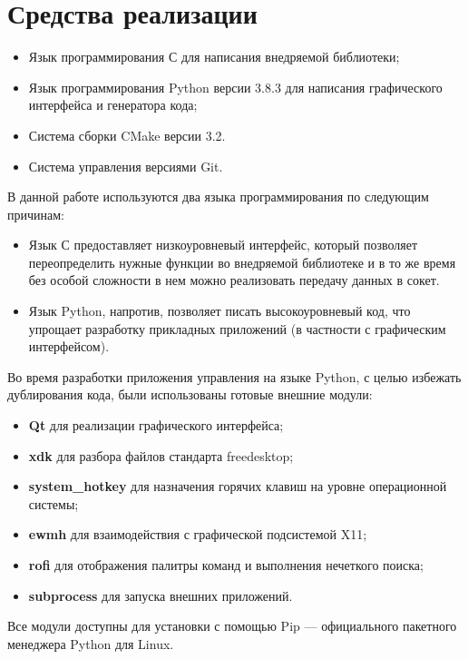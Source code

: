 \section{Средства реализации}

\begin{itemize}
	\item Язык программирования С для написания внедряемой библиотеки;
	\item Язык программирования Python версии 3.8.3 для написания графического
		интерфейса и генератора кода;
	\item Система сборки CMake версии 3.2.
	\item Система управления версиями Git.
\end{itemize}

В данной работе используются два языка программирования по следующим причинам:

\begin{itemize}
	\item Язык С предоставляет низкоуровневый интерфейс, который позволяет
		переопределить нужные функции во внедряемой библиотеке и в то же время
		без особой сложности в нем можно реализовать передачу данных в сокет.
	\item Язык Python, напротив, позволяет писать высокоуровневый код, что
		упрощает разработку прикладных приложений (в частности с графическим
		интерфейсом).
\end{itemize}

Во время разработки приложения управления на языке Python, с целью избежать
дублирования кода, были использованы готовые внешние модули:

\begin{itemize}
	\item \textbf{Qt} для реализации графического интерфейса;
	\item \textbf{xdk} для разбора файлов стандарта freedesktop;
	\item \textbf{system\_hotkey} для назначения горячих клавиш на уровне
		операционной системы;
	\item \textbf{ewmh} для взаимодействия с графической подсистемой X11;
	\item \textbf{rofi} для отображения палитры команд и выполнения нечеткого
		поиска;
	\item \textbf{subprocess} для запуска внешних приложений.
\end{itemize}

Все модули доступны для установки с помощью Pip — официального пакетного
менеджера Python для Linux.


